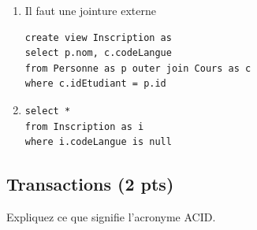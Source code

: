 \begin{solution}
\begin{enumerate}
\item Il faut une jointure externe
\begin{verbatim}
create view Inscription as 
select p.nom, c.codeLangue
from Personne as p outer join Cours as c 
where c.idEtudiant = p.id
\end{verbatim}

\item 
\begin{verbatim}
select *
from Inscription as i
where i.codeLangue is null
\end{verbatim}
 \end{enumerate}

\end{solution}

\subsection*{Transactions (2 pts)}

Expliquez ce que signifie l'acronyme ACID.



